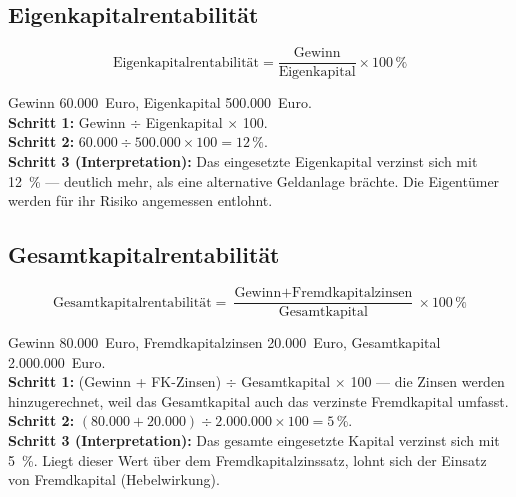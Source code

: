 \documentclass[11pt, a4paper]{article}
\begin{document}
\subsection{Eigenkapitalrentabilität}

\[
\mbox{Eigenkapitalrentabilität} = \frac{\mbox{Gewinn}}{\mbox{Eigenkapital}} \times 100\,\%
\]

\begin{beispiel}[title={Beispiel: Eigenkapitalrentabilität}]
Gewinn 60.000~Euro, Eigenkapital 500.000~Euro.\\
\textbf{Schritt 1:} Gewinn $\div$ Eigenkapital $\times$ 100.\\
\textbf{Schritt 2:} $60.000 \div 500.000 \times 100 = 12\,\%$.\\
\textbf{Schritt 3 (Interpretation):} Das eingesetzte Eigenkapital verzinst sich mit
12~\% --- deutlich mehr, als eine alternative Geldanlage brächte. Die Eigentümer werden
für ihr Risiko angemessen entlohnt.
\end{beispiel}

\subsection{Gesamtkapitalrentabilität}

\[
\mbox{Gesamtkapitalrentabilität} =
\frac{\mbox{Gewinn} + \mbox{Fremdkapitalzinsen}}{\mbox{Gesamtkapital}} \times 100\,\%
\]

\begin{beispiel}[title={Beispiel: Gesamtkapitalrentabilität}]
Gewinn 80.000~Euro, Fremdkapitalzinsen 20.000~Euro, Gesamtkapital 2.000.000~Euro.\\
\textbf{Schritt 1:} (Gewinn + FK-Zinsen) $\div$ Gesamtkapital $\times$ 100 --- die
Zinsen werden hinzugerechnet, weil das Gesamtkapital auch das verzinste Fremdkapital
umfasst.\\
\textbf{Schritt 2:} $(80.000 + 20.000) \div 2.000.000 \times 100 = 5\,\%$.\\
\textbf{Schritt 3 (Interpretation):} Das gesamte eingesetzte Kapital verzinst sich mit
5~\%. Liegt dieser Wert über dem Fremdkapitalzinssatz, lohnt sich der Einsatz von
Fremdkapital (Hebelwirkung).
\end{beispiel}
\end{document}
